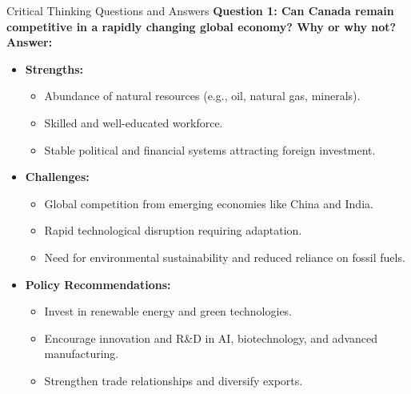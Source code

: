 \begin{frame}{Critical Thinking Questions and Answers}
  \textbf{Question 1: Can Canada remain competitive in a rapidly changing global economy? Why or why not?}
  \pause
  \textbf{Answer:}
  \begin{itemize}
    \item \textbf{Strengths:}
      \begin{itemize}
        \item Abundance of natural resources (e.g., oil, natural gas, minerals).
        \item Skilled and well-educated workforce.
        \item Stable political and financial systems attracting foreign investment.
      \end{itemize}
    \item \textbf{Challenges:}
      \begin{itemize}
        \item Global competition from emerging economies like China and India.
        \item Rapid technological disruption requiring adaptation.
        \item Need for environmental sustainability and reduced reliance on fossil fuels.
      \end{itemize}
    \item \textbf{Policy Recommendations:}
      \begin{itemize}
        \item Invest in renewable energy and green technologies.
        \item Encourage innovation and R&D in AI, biotechnology, and advanced manufacturing.
        \item Strengthen trade relationships and diversify exports.
      \end{itemize}
  \end{itemize}
\end{frame}


